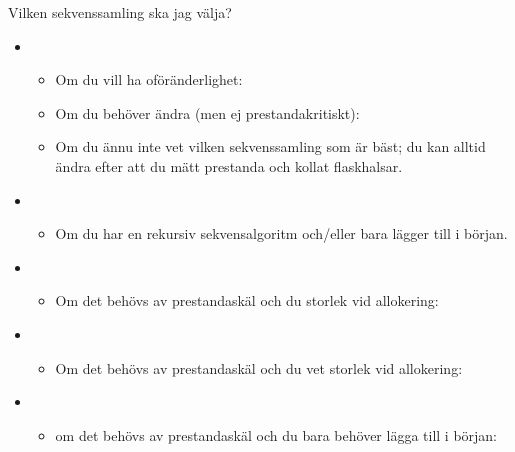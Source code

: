 \begin{Slide}{Vilken sekvenssamling ska jag välja?}\SlideFontSmall
\vspace{-0.5em}
\begin{itemize}
\item {} 
  \begin{itemize}\SlideFontTiny
  \item Om du vill ha oföränderlighet: 
  \item Om du behöver ändra (men ej prestandakritiskt):\\ 
  \item Om du ännu inte vet vilken sekvenssamling som är bäst; du kan alltid ändra efter att du mätt prestanda och kollat flaskhalsar.
  \end{itemize}

\item {} 
  \begin{itemize}\SlideFontTiny
  \item Om du har en rekursiv sekvensalgoritm och/eller bara lägger till i början.
  \end{itemize}


\item {} 
  \begin{itemize}\SlideFontTiny
  \item Om det behövs av prestandaskäl och du  storlek vid allokering:\\ 
  \end{itemize}

\item {}  
  \begin{itemize}\SlideFontTiny
  \item Om det behövs av prestandaskäl och du  vet storlek vid allokering:\\  
  \end{itemize}

\item {}  
  \begin{itemize}\SlideFontTiny
  \item om det behövs av prestandaskäl och du bara behöver lägga till i början:\\  
  \end{itemize}

\end{itemize}
\end{Slide}

